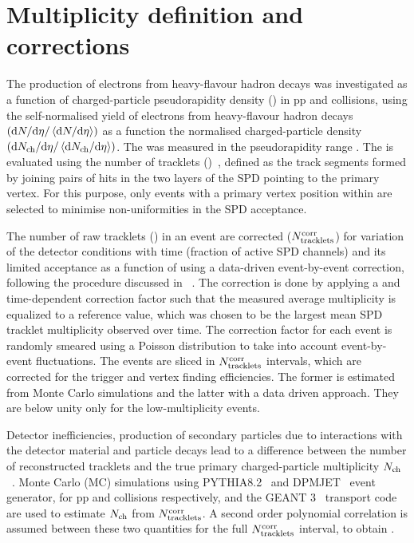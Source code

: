 \section{Multiplicity definition and corrections}\label{section:multiplicityanalysis}

The production of electrons from heavy-flavour hadron decays was investigated as a function of charged-particle pseudorapidity density (\dnchdeta) in pp and \pPb collisions, using the self-normalised yield of electrons from heavy-flavour hadron decays  $\left( {\rm d}N/{\rm d}\eta/\left<{\rm d}N/{\rm d}\eta\right>\right)$ as a function the normalised charged-particle density $\left( {\rm d}N_{\rm ch}/{\rm d}\eta/\left<{\rm d}N_{\rm ch}/{\rm d}\eta\right> \right)$.  The \dnchdeta was measured in the pseudorapidity range . The \dnchdeta is evaluated using the number of tracklets (\ntracklets)~\cite{ALICE:2012xs,Acharya:2018egz}, defined as the track segments formed by joining
 pairs of hits in the two layers of the SPD pointing to the primary vertex. For this purpose, only events with a primary vertex position within  are selected to minimise non-uniformities in the SPD acceptance. 

The number of raw tracklets (\ntracklets) in an event are corrected ($N^{\rm{corr}}_{\rm{tracklets}}$) for variation of the detector conditions with time (fraction of active SPD channels) and its limited acceptance as a function of \zvertex using a data-driven event-by-event correction, following the procedure discussed in ~\cite{Abelev:2012rz,Adam:2015ota,Acharya:2020pit,Acharya:2020giw}. The correction is done by applying a \zvertex and time-dependent correction factor such that the measured average multiplicity is equalized to a reference value, which was chosen to be the largest mean SPD tracklet multiplicity observed over time. The correction factor for each event is randomly smeared using a Poisson distribution to take into account event-by-event fluctuations. The
events are sliced in $N^{\rm{corr}}_{\rm{tracklets}}$ intervals, which are  corrected for the trigger and vertex finding efficiencies. The former is estimated from Monte Carlo simulations and the latter with a data driven approach. They are below unity only for the low-multiplicity events.

Detector inefficiencies, production of secondary particles due to interactions with the detector material and particle decays lead to a difference between the number of reconstructed tracklets and the
true primary charged-particle multiplicity $N_{\rm{ch}}$~\cite{Adam:2015pza}. Monte Carlo (MC) simulations using PYTHIA8.2~\cite{Sjostrand:2006za} and DPMJET~\cite{Roesler:2000he} event generator, for pp and \pPb collisions respectively, and the GEANT 3~\cite{Brun:1073159} transport code are used to estimate $N_{\rm{ch}}$ from $N^{\rm{corr}}_{\rm{tracklets}}$. A second order polynomial correlation is assumed between these two quantities for the full $N^{\rm{corr}}_{\rm{tracklets}}$ interval, to obtain \dnchdeta. 


